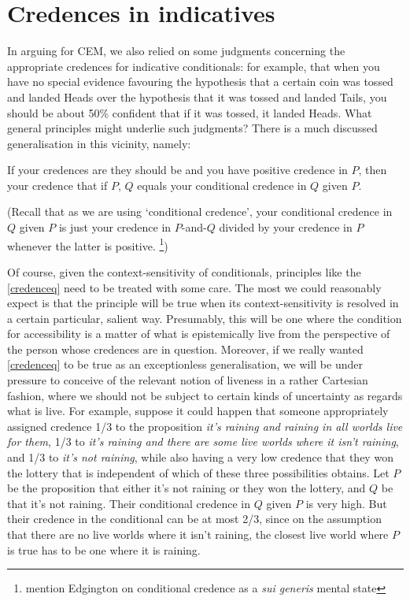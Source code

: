 \documentclass[If.tex]{subfiles}
\begin{document}
\section{Credences in indicatives}
In arguing for CEM, we also relied on some judgments concerning the appropriate credences for indicative conditionals: for example, that when you have no special evidence favouring the hypothesis that a certain coin was tossed and landed Heads over the hypothesis that it was tossed and landed Tails, you should be about 50\% confident that if it was tossed, it landed Heads.  What general principles might underlie such judgments?  There is a much discussed generalisation in this vicinity, namely:
\begin{prop}
	 \label{credenceq}
	If your credences are they should be and you have positive credence in $P$, then your credence that if $P$, $Q$ equals your conditional credence in $Q$ given $P$. 
\end{prop}
(Recall that as we are using ‘conditional credence’, your conditional credence in $Q$ given $P$ is just your credence in $P$-and-$Q$ divided by your credence in $P$ whenever the latter is positive.%
\footnote{mention Edgington on conditional credence as a \emph{sui generis} mental state})

Of course, given the context-sensitivity of conditionals, principles like the \ref{credenceq} need to be treated with some care. The most we could reasonably expect is that the principle will be true when its context-sensitivity is resolved in a certain particular, salient way.  Presumably, this will be one where the condition for accessibility is a matter of what is epistemically live from the perspective of the person whose credences are in question.  Moreover, if we really wanted \ref{credenceq} to be true as an exceptionless generalisation, we will be under pressure to conceive of the relevant notion of liveness in a rather Cartesian fashion, where we should not be subject to certain kinds of uncertainty as regards what is live.  For example, suppose it could happen that someone appropriately assigned credence 1/3 to the proposition \emph{it's raining and raining in all worlds live for them}, 1/3 to \emph{it's raining and there are some live worlds where it isn't raining}, and 1/3 to \emph{it's not raining}, while also having a very low credence that they won the lottery that is independent of which of these three possibilities obtains.  Let $P$ be the proposition that either it's not raining or they won the lottery, and $Q$ be that it's not raining.  Their conditional credence in $Q$ given $P$ is very high.  But their credence in the conditional can be at most 2/3, since on the assumption that there are no live worlds where it isn't raining, the closest live world where $P$ is true has to be one where it is raining.
\end{document}
